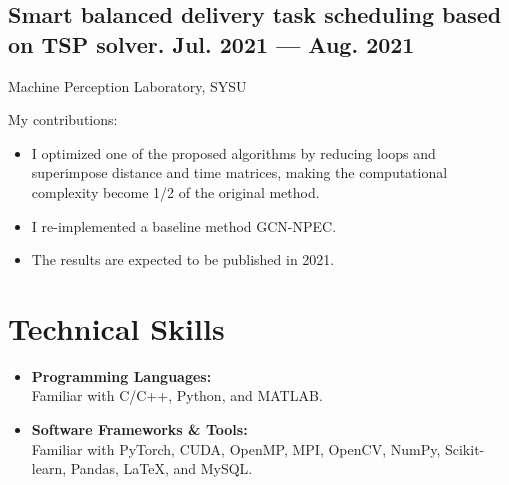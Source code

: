 \documentclass[a4,11pt]{article}
\newcommand{\subtext}[1]{
#1\par\vspace{-0.2cm}}
\newenvironment{zitemize}{
\begin{itemize}\itemsep0pt \parskip0pt \parsep1pt}
{\end{itemize}\vspace{-0.5cm}}
\begin{document}
\subsection*{Smart balanced delivery task scheduling based on TSP solver. \hfill Jul. 2021 --- Aug. 2021} 
\subtext{Machine Perception Laboratory, SYSU } 
\vspace {6pt}
My contributions:
    \begin{itemize}[topsep = 0 pt, itemsep = 0 pt, parsep = 1 pt]
        \item I optimized one of the proposed algorithms by reducing loops and superimpose distance and time matrices, making the computational complexity become 1/2 of the original method. 
		\item I re-implemented a baseline method GCN-NPEC. 
		\item The results are expected to be published in 2021.
    \end{itemize}





\section{\large \textbf{Technical Skills}}
\begin{zitemize}

\vspace{0.2cm}

\item \textbf{Programming Languages:} \\ 
			Familiar \space with \space C/C++, \space Python, \space and \space MATLAB.

\vspace{0.2cm}

\item \textbf{Software Frameworks \& Tools:}\\
			 Familiar \space with \space PyTorch, \space CUDA, \space OpenMP, \space MPI, \space OpenCV, \space NumPy, \space Scikit-learn, \space Pandas,  \space LaTeX, \space and \space MySQL.


\end{zitemize}



\end{document}
